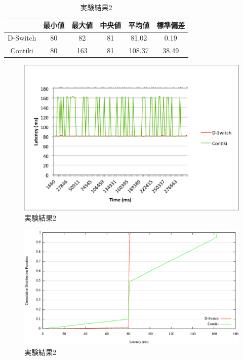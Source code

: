 \begin{table}[htb]
  \centering
  \caption{実験結果2}
  \begin{tabular}{|c||c|c|c|c|c|} \hline
    \backslashbox{}{} & 最小値 & 最大値 & 中央値 & 平均値 & 標準偏差 \\ \hline \hline
    D-Switch & 80 & 82 & 81 & 81.02 & 0.19 \\ \hline
    Contiki & 80 & 163 & 81 & 108.37 & 38.49 \\ \hline
  \end{tabular}
  \label{tab:latency2}
\end{table}

\begin{figure}[htbp]
 \begin{center}
  \includegraphics[width=120mm]{./images/latency2.eps}
 \end{center}
 \caption{実験結果2}
 \label{fig:latency2}
\end{figure}

\begin{figure}[htbp]
 \begin{center}
  \includegraphics[width=120mm]{./images/cdf2.eps}
 \end{center}
 \caption{実験結果2}
 \label{fig:cdf2}
\end{figure}


